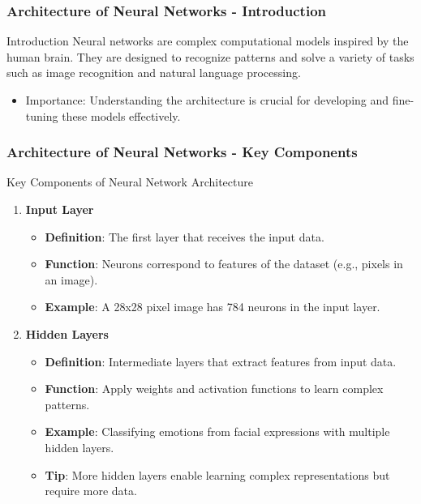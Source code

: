 \documentclass[aspectratio=169]{beamer}
\begin{document}
\begin{frame}[fragile]
    \frametitle{Architecture of Neural Networks - Introduction}
    \begin{block}{Introduction}
        Neural networks are complex computational models inspired by the human brain. They are designed to recognize patterns and solve a variety of tasks such as image recognition and natural language processing.
        \begin{itemize}
            \item Importance: Understanding the architecture is crucial for developing and fine-tuning these models effectively.
        \end{itemize}
    \end{block}
\end{frame}

\begin{frame}[fragile]
    \frametitle{Architecture of Neural Networks - Key Components}
    \begin{block}{Key Components of Neural Network Architecture}
        \begin{enumerate}
            \item \textbf{Input Layer}
                \begin{itemize}
                    \item \textbf{Definition}: The first layer that receives the input data.
                    \item \textbf{Function}: Neurons correspond to features of the dataset (e.g., pixels in an image).
                    \item \textbf{Example}: A 28x28 pixel image has 784 neurons in the input layer.
                \end{itemize}
            \item \textbf{Hidden Layers}
                \begin{itemize}
                    \item \textbf{Definition}: Intermediate layers that extract features from input data.
                    \item \textbf{Function}: Apply weights and activation functions to learn complex patterns.
                    \item \textbf{Example}: Classifying emotions from facial expressions with multiple hidden layers.
                    \item \textbf{Tip}: More hidden layers enable learning complex representations but require more data.
                \end{itemize}

\end{enumerate}
\end{block}
\end{frame}
\end{document}
